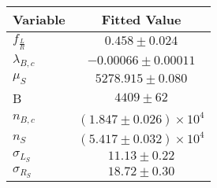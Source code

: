 \begin{tabular}[t]{lc}
\hline
Variable &Fitted Value\\
\hline\hline
$f_{\frac{L}{R}}$&$0.458\pm0.024$\\
\hline
$\lambda_{B,c}$&$-0.00066\pm0.00011$\\
\hline
$\mu_S$&$5278.915\pm0.080$\\
\hline
B&$4409\pm62$\\
\hline
$n_{B,c}$&$(1.847\pm0.026)\times 10^4$\\
\hline
$n_S$&$(5.417\pm0.032)\times 10^4$\\
\hline
$\sigma_{L_S}$&$11.13\pm0.22$\\
\hline
$\sigma_{R_S}$&$18.72\pm0.30$\\
\hline
\end{tabular}